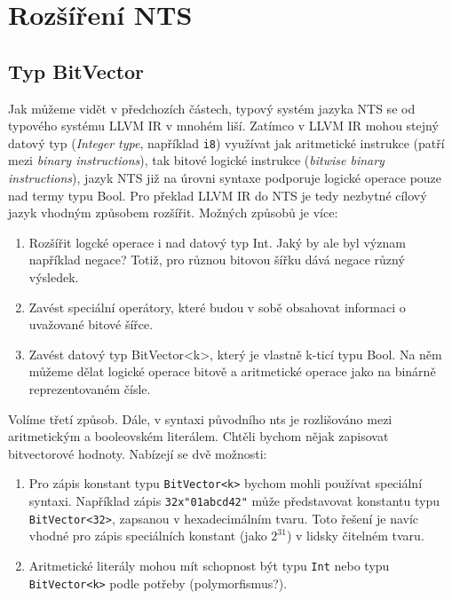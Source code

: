 \documentclass[12pt]{fithesis2}
\begin{document}
\section{Rozšíření NTS}
\label{sec:nts-extensions}
\subsection{Typ BitVector}
Jak můžeme vidět v předchozích částech, typový systém jazyka NTS se od typového systému LLVM IR 
v mnohém liší. Zatímco v LLVM IR mohou stejný datový typ (\textit{Integer type}, například \texttt{i8}) využívat jak aritmetické instrukce (patří mezi \textit{binary instructions}), tak bitové logické instrukce (\textit{bitwise binary instructions}), jazyk NTS již na úrovni syntaxe podporuje logické operace pouze nad termy typu Bool. Pro překlad LLVM IR do NTS je tedy nezbytné cílový jazyk vhodným způsobem rozšířit. Možných způsobů je více:
\begin{enumerate}
\item Rozšířit logcké operace i nad datový typ Int. Jaký by ale byl význam například negace? Totiž, pro různou bitovou šířku dává negace různý výsledek.

\item Zavést speciální operátory, které budou v sobě obsahovat informaci o uvažované bitové šířce.

\item Zavést datový typ BitVector<k>, který je vlastně k-ticí typu Bool. Na něm můžeme dělat logické operace bitově a aritmetické operace jako na binárně reprezentovaném čísle. 
\end{enumerate}
Volíme třetí způsob. Dále, v syntaxi původního nts je rozlišováno mezi aritmetickým a booleovském literálem. Chtěli bychom nějak zapisovat bitvectorové hodnoty. Nabízejí se dvě možnosti:
\begin{enumerate}

\item Pro zápis konstant typu \texttt{BitVector<k>} bychom mohli používat speciální syntaxi. Například zápis \texttt{32x"01abcd42"} může představovat konstantu typu \texttt{BitVector<32>}, zapsanou v hexadecimálním tvaru. Toto řešení je navíc vhodné pro zápis speciálních konstant (jako $2^{31}$) v lidsky čitelném tvaru. 

\item Aritmetické literály mohou mít schopnost být typu \texttt{Int} nebo typu \texttt{BitVector<k>} podle potřeby (polymorfismus?).

\end{enumerate}
\end{document}
